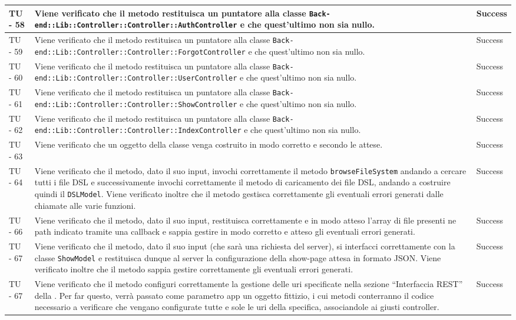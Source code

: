 \begin{center}
\begin{longtable}{ | p{3cm} | p{9cm} | p{2cm} | }
TU - 58 & Viene verificato che il metodo restituisca un puntatore alla classe \texttt{Back-end::Lib::Controller::Controller::AuthController} e che quest'ultimo non sia nullo. & Success \\ \hline
TU - 59 & Viene verificato che il metodo restituisca un puntatore alla classe \texttt{Back-end::Lib::Controller::Controller::ForgotController} e che quest'ultimo non sia nullo. & Success \\ \hline
TU - 60 & Viene verificato che il metodo restituisca un puntatore alla classe \texttt{Back-end::Lib::Controller::Controller::UserController} e che quest'ultimo non sia nullo. & Success \\ \hline
TU - 61 & Viene verificato che il metodo restituisca un puntatore alla classe \texttt{Back-end::Lib::Controller::Controller::ShowController} e che quest'ultimo non sia nullo. & Success \\ \hline
TU - 62 & Viene verificato che il metodo restituisca un puntatore alla classe \texttt{Back-end::Lib::Controller::Controller::IndexController} e che quest'ultimo non sia nullo. & Success \\ \hline
TU - 63 & Viene verificato che un oggetto della classe venga costruito in modo corretto e secondo le attese. & Success \\ \hline
TU - 64 & Viene verificato che il metodo, dato il suo input, invochi correttamente il metodo \texttt{browseFileSystem} andando a cercare tutti i file DSL e successivamente invochi correttamente il metodo di caricamento dei file DSL, andando a costruire quindi il \texttt{DSLModel}. Viene verificato inoltre che il metodo gestisca correttamente gli eventuali errori generati dalle chiamate alle varie funzioni. & Success \\ \hline
TU - 66 & Viene verificato che il metodo, dato il suo input, restituisca  correttamente e in modo atteso l'array di file presenti ne path indicato tramite una callback e sappia gestire in modo corretto e atteso gli eventuali errori generati. & Success \\ \hline
TU - 67 & Viene verificato che il metodo, dato il suo input (che sarà una richiesta del server), si interfacci correttamente con la classe \texttt{ShowModel} e restituisca dunque al server la configurazione della show-page attesa in formato JSON. Viene verificato inoltre che il metodo sappia gestire correttamente gli eventuali errori generati.  & Success \\ \hline
TU - 67 & Viene verificato che il metodo configuri correttamente la gestione delle uri specificate nella sezione ``Interfaccia REST'' della \SpecificaTecnica{}. Per far questo, verrà passato come parametro app un oggetto fittizio, i cui metodi conterranno il codice necessario a verificare che vengano configurate tutte e sole le uri della specifica, associandole ai giusti controller. & Success \\ \hline

\end{longtable}
\end{center}
